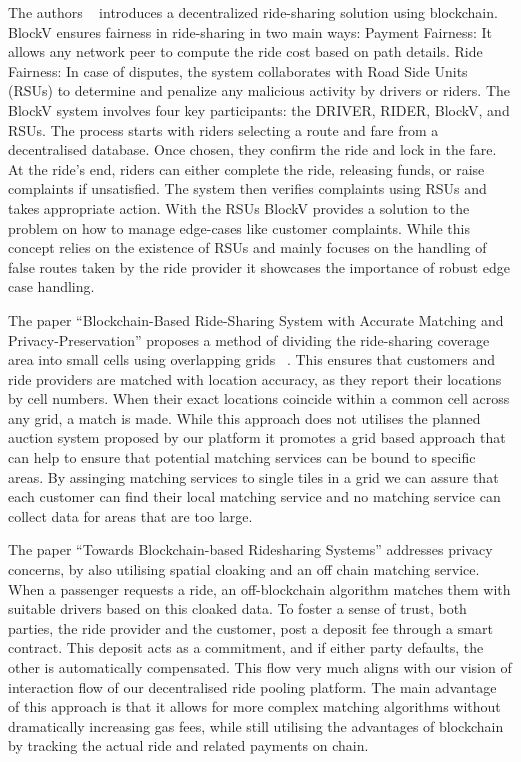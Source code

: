 The authors ~\cite{Pal.}  introduces a decentralized ride-sharing solution using blockchain. BlockV ensures fairness in ride-sharing in two main ways:
Payment Fairness: It allows any network peer to compute the ride cost based on path details.
Ride Fairness: In case of disputes, the system collaborates with Road Side Units (RSUs) to determine and penalize any malicious activity by drivers or riders.
The BlockV system involves four key participants: the DRIVER, RIDER, BlockV, and RSUs. The process starts with riders selecting a route and fare from a decentralised database. Once chosen, they confirm the ride and lock in the fare. At the ride's end, riders can either complete the ride, releasing funds, or raise complaints if unsatisfied. The system then verifies complaints using RSUs and takes appropriate action.
With the RSUs BlockV provides a solution to the problem on how to manage edge-cases like customer complaints. While this concept relies on the existence of RSUs and mainly focuses on the handling of false routes taken by the ride provider it showcases the importance of robust edge case handling.

The paper ``Blockchain-Based Ride-Sharing System with Accurate Matching and Privacy-Preservation'' proposes a method of dividing the ride-sharing coverage area into small cells using overlapping grids ~\cite{Badr.}. This ensures that customers and ride providers are matched with location accuracy, as they report their locations by cell numbers. When their exact locations coincide within a common cell across any grid, a match is made. While this approach does not utilises the planned auction system proposed by our platform it promotes a grid based approach that can help to ensure that potential matching services can be bound to specific areas. By assinging matching services to single tiles in a grid we can assure that each customer can find their local matching service and no matching service can collect data for areas that are too large.


The paper ``Towards Blockchain-based Ridesharing Systems'' addresses privacy concerns, by also utilising spatial cloaking and an off chain matching service.~\cite{Vazquez.} When a passenger requests a ride, an off-blockchain algorithm matches them with suitable drivers based on this cloaked data. To foster a sense of trust, both parties, the ride provider and the customer, post a deposit fee through a smart contract. This deposit acts as a commitment, and if either party defaults, the other is automatically compensated. This flow very much aligns with our vision of interaction flow of our decentralised ride pooling platform. The main advantage of this approach is that it allows for more complex matching algorithms without dramatically increasing gas fees, while still utilising the advantages of blockchain by tracking the actual ride and related payments on chain. 

